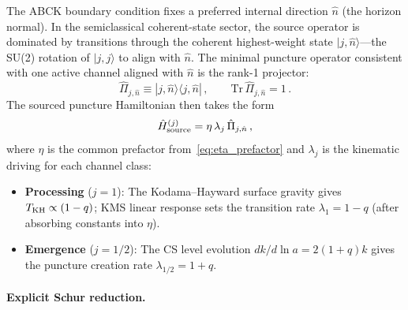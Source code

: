 \documentclass[aps,prd,twocolumn,10pt,superscriptaddress,nofootinbib]{revtex4-2}
\begin{document}
The ABCK boundary condition fixes a preferred internal direction
$\hat{n}$ (the horizon normal).  In the semiclassical
coherent-state sector, the source operator is dominated by
transitions through the coherent highest-weight state
$|j,\hat{n}\rangle$---the SU(2) rotation of $|j,j\rangle$ to
align with $\hat{n}$.  The minimal puncture operator consistent
with one active channel aligned with $\hat{n}$ is the rank-1
projector:
\begin{equation}
\hat{\Pi}_{j,\hat{n}} \equiv
  |j,\hat{n}\rangle\langle j,\hat{n}|\,,\qquad
  \mathrm{Tr}\,\hat{\Pi}_{j,\hat{n}} = 1\,.
\label{eq:rank1}
\end{equation}
The sourced puncture Hamiltonian then takes the form
\begin{equation}
\hat{H}_{\rm source}^{(j)}
  = \eta\,\lambda_j\,\hat{\Pi}_{j,\hat{n}}\,,
\label{eq:H_source}
\end{equation}
where $\eta$ is the common prefactor
from~\eqref{eq:eta_prefactor} and $\lambda_j$ is the kinematic
driving for each channel class:
\begin{itemize}
\item \textbf{Processing} ($j = 1$): The Kodama--Hayward surface
  gravity gives $T_{\rm KH} \propto (1-q)$; KMS linear response sets the
  transition rate $\lambda_1 = 1-q$ (after absorbing constants
  into $\eta$).
\item \textbf{Emergence} ($j = 1/2$): The CS level evolution
  $dk/d\ln a = 2(1+q)k$ gives the puncture creation rate
  $\lambda_{1/2} = 1+q$.
\end{itemize}

\paragraph{Explicit Schur reduction.}
\end{document}
